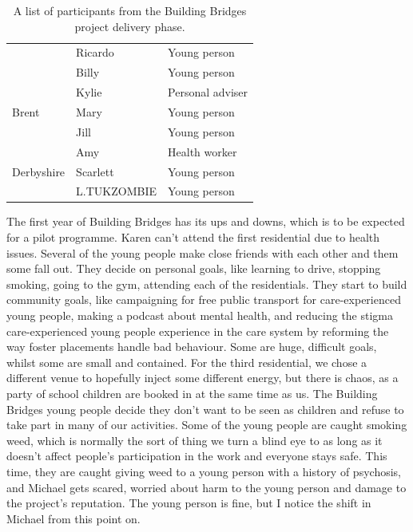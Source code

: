 \begin{table}[hbt!]
\begin{tabular}{|l|l|l|}
                               & Ricardo                   & Young person                  \\ \cline{2-3} 
                               & Billy                     & Young person                  \\ \hline
\multirow{3}{*}{Brent}         & Kylie                     & Personal adviser              \\ \cline{2-3} 
                               & Mary                      & Young person                  \\ \cline{2-3} 
                               & Jill                      & Young person                  \\ \hline
\multirow{3}{*}{Derbyshire}    & Amy                       & Health worker                 \\ \cline{2-3} 
                               & Scarlett                  & Young person                  \\ \cline{2-3} 
                               & L.TUKZOMBIE               & Young person                  \\ \hline
\end{tabular}
\caption{A list of participants from the Building Bridges project delivery phase.}
\label{tab:building-bridges-bridges}
\end{table}
The first year of Building Bridges has its ups and downs, which is to be expected for a pilot programme. Karen can't attend the first residential due to health issues. Several of the young people make close friends with each other and them some fall out. They decide on personal goals, like learning to drive, stopping smoking, going to the gym, attending each of the residentials. They start to build community goals, like campaigning for free public transport for care-experienced young people, making a podcast about mental health, and reducing the stigma care-experienced young people experience in the care system by reforming the way foster placements handle bad behaviour. Some are huge, difficult goals, whilst some are small and contained. For the third residential, we chose a different venue to hopefully inject some different energy, but there is chaos, as a party of school children are booked in at the same time as us.  The Building Bridges young people decide they don't want to be seen as children and refuse to take part in many of our activities. Some of the young people are caught smoking weed, which is normally the sort of thing we turn a blind eye to as long as it doesn't affect people's participation in the work and everyone stays safe. This time, they are caught giving weed to a young person with a history of psychosis, and Michael gets scared, worried about harm to the young person and damage to the project's reputation. The young person is fine, but I notice the shift in Michael from this point on.

